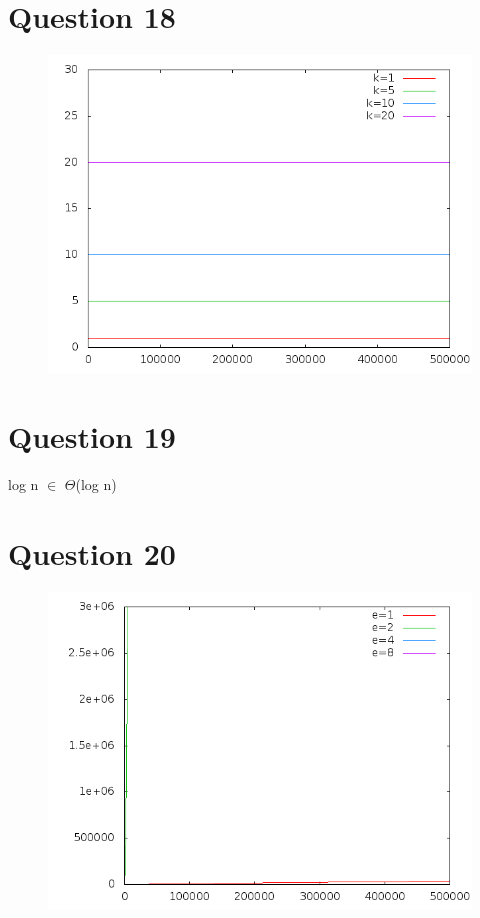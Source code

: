 \documentclass[a4paper,12pt]{report}
\begin{document}
\section*{Question 18}
\begin{figure}[!ht]
	\center
	\includegraphics[scale=0.4]{q18.png}
\end{figure}

\section*{Question 19}
log n $\in$ $\Theta$(log n)
\newpage

\section*{Question 20}
\begin{figure}[!ht]
	\center
	\includegraphics[scale=0.4]{q20.png}
\end{figure}
\end{document}
